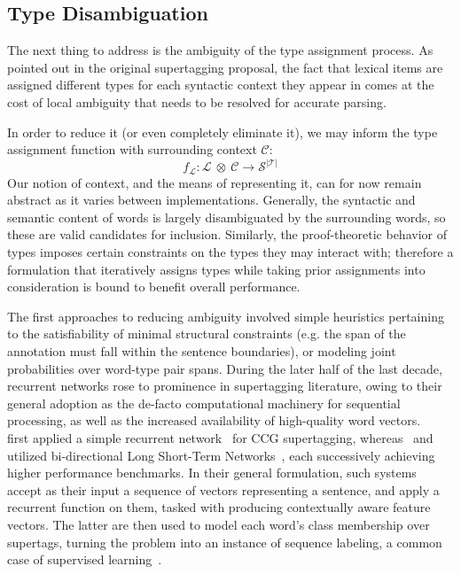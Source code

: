 \subsection{Type Disambiguation}
The next thing to address is the ambiguity of the type assignment process.
As pointed out in the original supertagging proposal, the fact that lexical items are assigned different types for each syntactic context they appear in comes at the cost of local ambiguity that needs to be resolved for accurate parsing.

In order to reduce it (or even completely eliminate it), we may inform the type assignment function with surrounding context $\mathcal{C}$:
\[
f_\mathcal{L}: \mathcal{L} \ \otimes \ \mathcal{C} \to \mathcal{S}^{|\mathcal{T}|}
\]
Our notion of context, and the means of representing it, can for now remain abstract as it varies between implementations.
Generally, the syntactic and semantic content of words is largely disambiguated by the surrounding words, so these are valid candidates for inclusion.
Similarly, the proof-theoretic behavior of types imposes certain constraints on the types they may interact with; therefore a formulation that iteratively assigns types while taking prior assignments into consideration is bound to benefit overall performance.

The first approaches to reducing ambiguity involved simple heuristics pertaining to the satisfiability of minimal structural constraints (e.g. the span of the annotation must fall within the sentence boundaries), or modeling joint probabilities over word-type pair spans.
During the later half of the last decade, recurrent networks rose to prominence in supertagging literature, owing to their general adoption as the de-facto computational machinery for sequential processing, as well as the increased availability of high-quality word vectors.
~\cite{xu-etal-2015-ccg} first applied a simple recurrent network~\cite{elman1990finding} for CCG supertagging, whereas~\cite{lewis-etal-2016-lstm} and~\cite{vaswani-etal-2016-supertagging} utilized bi-directional Long Short-Term Networks~\cite{hochreiter1997long}, each successively achieving higher performance benchmarks.
In their general formulation, such systems accept as their input a sequence of vectors representing a sentence, and apply a recurrent function on them, tasked with producing contextually aware feature vectors.
The latter are then used to model each word's class membership over supertags, turning the problem into an instance of sequence labeling, a common case of supervised learning~\cite{graves2012supervised}.

